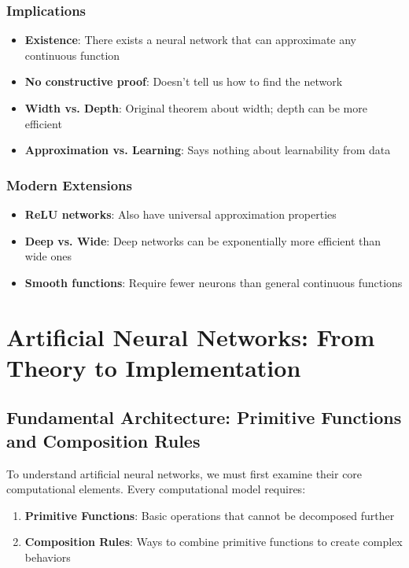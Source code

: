 \subsubsection{Implications}
\begin{itemize}
    \item \textbf{Existence}: There exists a neural network that can approximate any continuous function
    \item \textbf{No constructive proof}: Doesn't tell us how to find the network
    \item \textbf{Width vs. Depth}: Original theorem about width; depth can be more efficient
    \item \textbf{Approximation vs. Learning}: Says nothing about learnability from data
\end{itemize}

\subsubsection{Modern Extensions}
\begin{itemize}
    \item \textbf{ReLU networks}: Also have universal approximation properties
    \item \textbf{Deep vs. Wide}: Deep networks can be exponentially more efficient than wide ones
    \item \textbf{Smooth functions}: Require fewer neurons than general continuous functions
\end{itemize}

\section{Artificial Neural Networks: From Theory to Implementation}

\subsection{Fundamental Architecture: Primitive Functions and Composition Rules}
To understand artificial neural networks, we must first examine their core computational elements. Every computational model requires:
\begin{enumerate}
    \item \textbf{Primitive Functions}: Basic operations that cannot be decomposed further
    \item \textbf{Composition Rules}: Ways to combine primitive functions to create complex behaviors
\end{enumerate}

